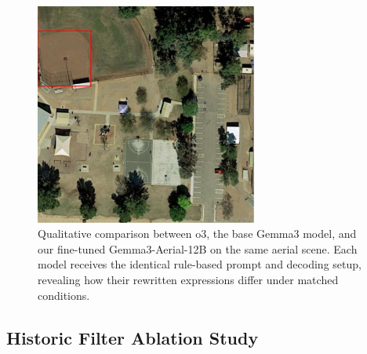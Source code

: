 \documentclass[journal]{IEEEtran}
\begin{document}
\begin{figure}[t]
\centering
\begin{minipage}{0.5\textwidth}
\centering
\includegraphics[width=0.65\textwidth]{./images/3llm.png}
\end{minipage}%
\begin{minipage}{0.5\textwidth}
\centering
\hspace{-1cm}
\end{minipage}
\caption{Qualitative comparison between o3, the base Gemma3 model, and our fine-tuned Gemma3-Aerial-12B on the same aerial scene. Each model receives the identical rule-based prompt and decoding setup, revealing how their rewritten expressions differ under matched conditions.}
\label{fig:distillation_comparison}
\end{figure}

\subsection{Historic Filter Ablation Study}
\label{subsec:historic_ablation}
\end{document}
